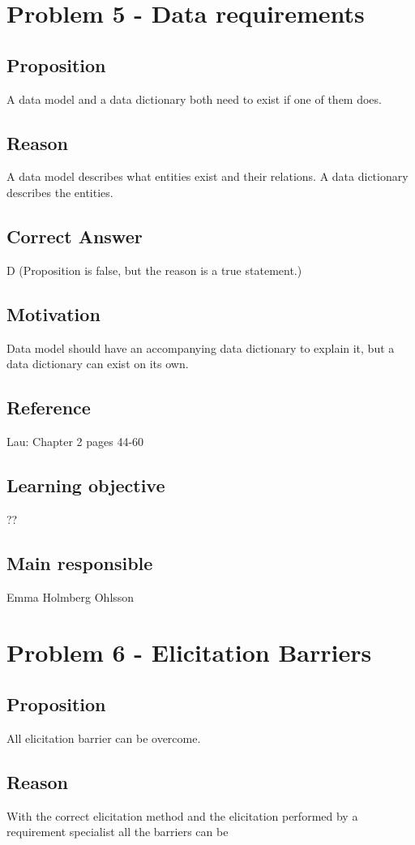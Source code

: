 \documentclass[a4paper]{article}
\begin{document}
\section{Problem 5 - Data requirements}
\subsection{Proposition}
A data model and a data dictionary both need to exist if one of them does.
\subsection{Reason}
A data model describes what entities exist and their relations. A data dictionary describes the entities.
\subsection{Correct Answer}
D (Proposition is false, but the reason is a true statement.)
\subsection{Motivation}
Data model should have an accompanying data dictionary to explain it, but a data dictionary can exist on its own.
\subsection{Reference}
Lau: Chapter 2 pages 44-60
\subsection{Learning objective}
??
\subsection{Main responsible}
Emma Holmberg Ohlsson

\section{Problem 6 - Elicitation Barriers}
\subsection{Proposition}
All elicitation barrier can be overcome.
\subsection{Reason}
With the correct elicitation method and the elicitation performed by a requirement specialist all the barriers can be 
\end{document}
